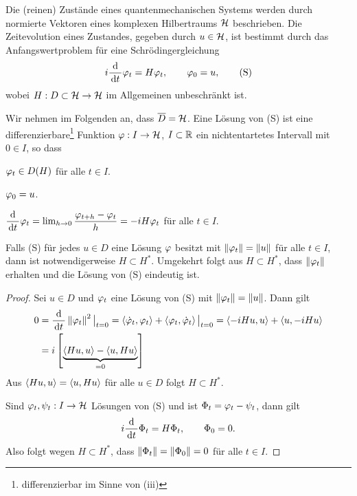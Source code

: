 Die (reinen) Zustände eines quantenmechanischen Systems werden durch normierte
Vektoren eines komplexen Hilbertraums $\mathcal{H}$ beschrieben. Die Zeitevolution
eines Zustandes, gegeben durch $u\in\mathcal{H}$, ist bestimmt durch das
Anfangswertproblem für eine Schrödingergleichung
\begin{align*}
i\frac{\mathrm{d}}{\,\mathrm{d} t\,}\varphi_t = H\varphi_t,\qquad \varphi_0 = u,\tag{S}
\end{align*}
wobei $H:D\subset\mathcal{H}\to\mathcal{H}$ im Allgemeinen unbeschränkt ist.

Wir nehmen im Folgenden an, dass $\overline{D}=\mathcal{H}$. Eine Lösung von (S) ist eine
differenzierbare\footnote{differenzierbar im Sinne von (iii)} Funktion $\varphi:
I\to\mathcal{H}$, $I\subset\mathbb{R}$ ein nichtentartetes Intervall mit $0\in I$, so dass
\begin{equivenum}
\item $\varphi_t \in D(H)$ für alle $t\in I$.
\item $\varphi_0 = u$.
\item $\dfrac{\mathrm{d}}{\,\mathrm{d} t\,}\varphi_t = \lim_{h\to 0} \dfrac{\varphi_{t+h}-\varphi_t}{h} =
-iH\varphi_t$ für alle $t\in I$.
\end{equivenum}
\begin{lem*}
Falls (S) für jedes $u\in D$ eine Lösung $\varphi$ besitzt mit $\left\|\varphi_t\right\| =
\left\|u\right\|$ für alle $t\in I$, dann ist notwendigerweise $H\subset H^*$. Umgekehrt
folgt aus $H\subset H^*$, dass $\left\|\varphi_t\right\|$ erhalten und die Lösung
von (S) eindeutig ist.\fishhere
\end{lem*}
\begin{proof}
Sei $u\in D$ und $\varphi_t$ eine Lösung von (S) mit $\left\|\varphi_t\right\| = \left\|u\right\|$. Dann
gilt
\begin{align*}
0 &= \frac{\mathrm{d}}{\,\mathrm{d} t\,}\left\|\varphi_t\right\|^2\big|_{t=0}
= \left\langle\dot{\varphi}_t,\varphi_t\right\rangle+\left\langle\varphi_t,\dot{\varphi}_t\right\rangle\big|_{t=0}
=  \left\langle-iHu,u\right\rangle +\left\langle u,-iHu\right\rangle\\ & = i
\left[\underbrace{\left\langle Hu,u\right\rangle-\left\langle u,Hu\right\rangle}_{=0}\right]
\end{align*}
Aus $\left\langle Hu,u\right\rangle = \left\langle u,Hu\right\rangle$ für alle $u\in D$ folgt $H\subset H^*$.

Sind $\varphi_t,\psi_t:I\to \mathcal{H}$ Lösungen von (S) und ist  $\Phi_t = \varphi_t-\psi_t$,
dann gilt
\begin{align*}
i\frac{\mathrm{d}}{\,\mathrm{d} t\,}\Phi_t = H\Phi_t,\qquad \Phi_0 = 0. 
\end{align*}
Also folgt wegen $H\subset H^*$, dass $\left\|\Phi_t\right\| = \left\|\Phi_0\right\| = 0$ für
alle $t\in I$.\qedhere
\end{proof}

